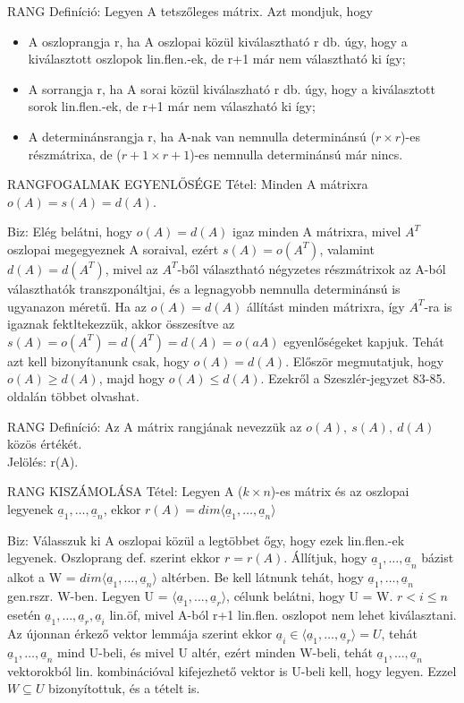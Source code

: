 \documentclass[]{article}
\newcommand{\Und}[1]{\underline{#1}}
\begin{document}
\begin{shaded}
RANG Definíció: Legyen A tetszőleges mátrix. Azt mondjuk, hogy
\begin{itemize}
\item A oszloprangja r, ha A oszlopai közül kiválasztható r db. úgy, hogy a kiválasztott oszlopok lin.flen.-ek, de r+1 már nem választható ki így;
\item A sorrangja r, ha A sorai közül kiválaszható r db. úgy, hogy a kiválasztott sorok lin.flen.-ek, de r+1 már nem válaszható ki így;
\item A determinánsrangja r, ha A-nak van nemnulla determinánsú ($r \times r$)-es részmátrixa, de ($r+1 \times r+1$)-es nemnulla determinánsú már nincs.
\end{itemize}
\end{shaded}
\begin{framed}
RANGFOGALMAK EGYENLŐSÉGE Tétel: Minden A mátrixra $o(A) = s(A) = d(A)$.
\end{framed}
\begin{leftbar}
Biz: Elég belátni, hogy $o(A) = d(A)$ igaz minden A mátrixra, mivel $A^T$ oszlopai megegyeznek A soraival, ezért $s(A) = o(A^T)$, valamint $d(A) = d(A^T)$, mivel az $A^T$-ből választható négyzetes részmátrixok az A-ból választhatók transzponáltjai, és a legnagyobb nemnulla determinánsú is ugyanazon méretű. Ha az $o(A) = d(A)$ állítást minden mátrixra, így $A^T$-ra is igaznak fektltekezzük, akkor összesítve az $s(A) = o(A^T) = d(A^T) = d(A) = o(aA)$ egyenlőségeket kapjuk. Tehát azt kell bizonyítanunk csak, hogy $o(A) = d(A)$. Először megmutatjuk, hogy $o(A) \geq d(A)$, majd hogy $o(A) \leq d(A)$. Ezekről a Szeszlér-jegyzet 83-85. oldalán többet olvashat.
\end{leftbar}
\begin{shaded}
RANG Definíció: Az A mátrix rangjának nevezzük az $o(A),\: s(A),\: d(A)$ közös értékét.\\
Jelölés: r(A).
\end{shaded}
\begin{framed}
RANG KISZÁMOLÁSA Tétel: Legyen A ($k \times n$)-es mátrix és az oszlopai legyenek $\Und{a}_1, \ldots, \Und{a}_n$, ekkor $r(A) = dim\langle\Und{a}_1, \ldots, \Und{a}_n\rangle$
\end{framed}
\begin{leftbar}
Biz: Válasszuk ki A oszlopai közül a legtöbbet őgy, hogy ezek lin.flen.-ek legyenek. Oszloprang def. szerint ekkor $r = r(A)$. Állítjuk, hogy $\Und{a}_1, \ldots, \Und{a}_n$ bázist alkot a W = $dim\langle\Und{a}_1, \ldots, \Und{a}_n\rangle$ altérben. Be kell látnunk tehát, hogy $\Und{a}_1, \ldots, \Und{a}_n$ gen.rszr. W-ben. Legyen U = $\langle\Und{a}_1, \ldots, \Und{a}_r\rangle$, célunk belátni, hogy U = W. $r < i \leq n$ esetén $\Und{a}_1, \ldots, \Und{a}_r, \Und{a}_i$ lin.öf, mivel A-ból r+1 lin.flen. oszlopot nem lehet kiválasztani. Az újonnan érkező vektor lemmája szerint ekkor $\Und{a}_i\in\langle\Und{a}_1, \ldots, \Und{a}_r\rangle = U$, tehát $\Und{a}_1, \ldots, \Und{a}_n$ mind U-beli, és mivel U altér, ezért minden W-beli, tehát $\Und{a}_1, \ldots, \Und{a}_n$ vektorokból lin. kombinációval kifejezhető vektor is U-beli kell, hogy legyen. Ezzel $W \subseteq U$ bizonyítottuk, és a tételt is.
\end{leftbar}
\end{document}
